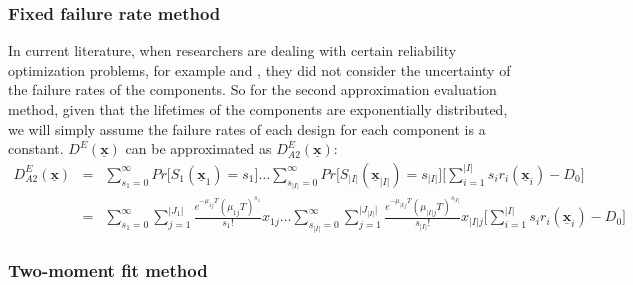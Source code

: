 \documentclass[preprint,12pt]{elsarticle}
\begin{document}
\subsubsection{Fixed failure rate method}
In current literature, when researchers are dealing with certain reliability optimization problems, for example \citet{Mettas} \citet{Oner2010} and \citet{Huang}, they did not consider the uncertainty of the failure rates of the components. So for the second approximation evaluation method, given that the lifetimes of the components are exponentially distributed, we will simply assume the failure rates of each design for each component is a constant. $D^{E}(\boldsymbol{\underline{x}})$ can be approximated as $D^{E}_{A2}(\boldsymbol{\underline{x}})$:
\small
\begin{eqnarray}
D^{E}_{A2}(\boldsymbol{\underline{x}}) &=& \sum_{s_{1}=0}^{\infty}Pr\bigg[S_{1}(\underline{\boldsymbol{x}}_{1})=s_{1}\bigg]\dots  \sum_{s_{\lvert I \rvert}=0}^{\infty}
Pr\bigg[S_{\lvert I \rvert}(\underline{\boldsymbol{x}}_{\lvert I \rvert})=s_{\lvert I \rvert}\bigg]\bigg[\sum_{i=1}^{\rvert I \lvert}s_{i}r_{i}(\boldsymbol{\underline{x}}_{i})-D_{0}\bigg] \nonumber\\
&=& \sum_{s_{1}=0}^{\infty}\sum_{j=1}^{\rvert J_{1}\lvert}{\frac{e^{-\mu_{1j}T}(\mu_{1j}T)^{s_{1}}}{s_{1}!}x_{1j}} \dots \sum_{s_{\rvert I \lvert}=0}^{\infty}\sum_{j=1}^{\rvert J_{\rvert I \lvert}\lvert}{\frac{e^{-\mu_{\rvert I \lvert j}T}(\mu_{\rvert I \lvert j}T)^{s_{\rvert I \lvert}}}{s_{\rvert I \lvert}!}x_{\rvert I \lvert j}}\bigg[\sum_{i=1}^{\rvert I \lvert}s_{i}r_{i}(\boldsymbol{\underline{x}}_{i})-D_{0}\bigg]\nonumber
\end{eqnarray}
\normalsize
\subsubsection{Two-moment fit method}
\end{document}
